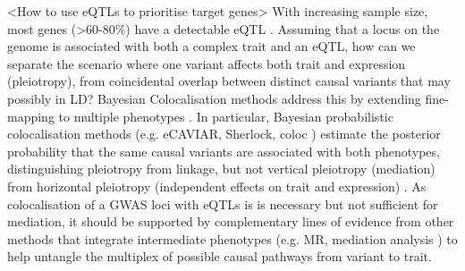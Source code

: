 \begin{outline}
\1 <How to use eQTLs to prioritise target genes>
\2 With increasing sample size, most genes (>60-80\%) have a detectable eQTL \autocite{vandiedonck2017GeneticAssociationMolecular,vosa2018UnravelingPolygenicArchitecture}.
Assuming that a locus on the genome is associated with both a complex trait and an \gls{eQTL},
how can we separate the scenario where one variant affects both trait and expression (pleiotropy),
from coincidental overlap between distinct causal variants that may possibly in \gls{LD}?
Bayesian Colocalisation methods address this by extending fine-mapping to multiple phenotypes \autocite{burgess2018InferringCausalRelationships}.
In particular, Bayesian probabilistic colocalisation methods (e.g. eCAVIAR, Sherlock, coloc \autocite{wallace2020ElicitingPriorsRelaxing}) 
estimate the posterior probability that the same causal variants are associated with both phenotypes,
distinguishing pleiotropy from linkage, 
but not vertical pleiotropy (mediation) from horizontal pleiotropy (independent effects on trait and expression) \autocite{hemani2018EvaluatingPotentialRole}.
As colocalisation of a \gls{GWAS} loci with \glspl{eQTL} is is necessary but not sufficient for mediation, 
it should be supported by complementary lines of evidence from other methods that integrate intermediate phenotypes (e.g. MR, mediation analysis \autocite{hemani2018EvaluatingPotentialRole})
to help untangle the multiplex of possible causal pathways from variant to trait.
%
%

\end{outline}
